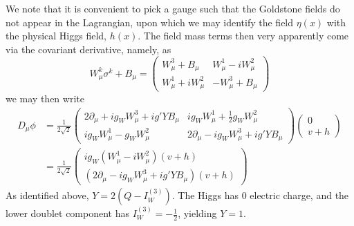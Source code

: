 We note that it is convenient to pick a gauge such that the Goldstone fields
do not appear in the Lagrangian, upon which we may identify the field $\eta(x)$ with the physical 
Higgs field, $h(x)$. The field mass terms then very apparently come via the covariant derivative, namely,
as 
\begin{equation}
W_{\mu}^{k}\sigma^{k}+B_{\mu} =
\begin{pmatrix}W_{\mu}^3+B_{\mu} & W_{\mu}^1-iW_{\mu}^2\\W_{\mu}^1+iW_{\mu}^2 & -W_{\mu}^3+B_{\mu}\end{pmatrix}
\end{equation}
we may then write
\begin{align}
D_{\mu}\phi &= 
\frac{1}{2\sqrt{2}}\begin{pmatrix}
2\partial_{\mu}+ig_{W}W_{\mu}^3+ig'YB_{\mu} & 
ig_{W}W_{\mu}^1+\frac{1}{2}g_{W}W_{\mu}^2\\
ig_{W}W_{\mu}^1-g_{W}W_{\mu}^2 &
2\partial_{\mu}-ig_{W}W_{\mu}^3+ig'YB_{\mu}\end{pmatrix}\begin{pmatrix}0\\ v+h\end{pmatrix}\\
&=\frac{1}{2\sqrt{2}}
\begin{pmatrix}
ig_{W}(W_{\mu}^1-iW_{\mu}^2)(v+h)\\
(2\partial_{\mu}-ig_{W}W_{\mu}^3+ig'YB_{\mu})(v+h)
 \end{pmatrix}
\end{align}
As identified above, $Y = 2(Q-I_{W}^{(3)})$. The Higgs has $0$ electric charge, and the lower 
doublet component has $I_{W}^{(3)} = -\frac{1}{2}$, yielding $Y=1$.

